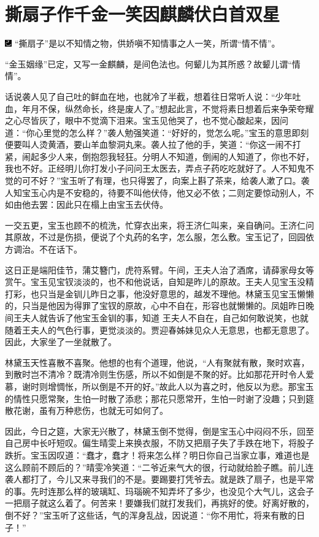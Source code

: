 

\chapter{撕扇子作千金一笑\hspace{.5em}因麒麟伏白首双星}

{\includegraphics[width=3mm]{../Images/00003}  \kaishu ``撕扇子''是以不知情之物，供娇嗔不知情事之人一笑，所谓``情不情''。}

{ \kaishu ``金玉姻缘''已定，又写一金麒麟，是间色法也。何颦儿为其所惑？故颦儿谓``情情''。}

话说袭人见了自己吐的鲜血在地，也就冷了半截，想着往日常听人说：``少年吐血，年月不保，纵然命长，终是废人了。''想起此言，不觉将素日想着后来争荣夸耀之心尽皆灰了，眼中不觉滴下泪来。宝玉见他哭了，也不觉心酸起来，因问道：``你心里觉的怎么样？''袭人勉强笑道：``好好的，觉怎么呢。''宝玉的意思即刻便要叫人烫黄酒，要山羊血黎洞丸来。袭人拉了他的手，笑道：``你这一闹不打紧，闹起多少人来，倒抱怨我轻狂。分明人不知道，倒闹的人知道了，你也不好，我也不好。正经明儿你打发小子问问王太医去，弄点子药吃吃就好了。人不知鬼不觉的可不好？''宝玉听了有理，也只得罢了，向案上斟了茶来，给袭人漱了口。袭人知宝玉心内是不安稳的，待要不叫他伏侍，他又必不依；二则定要惊动别人，不如由他去罢：因此只在榻上由宝玉去伏侍。

一交五更，宝玉也顾不的梳洗，忙穿衣出来，将王济仁叫来，亲自确问。王济仁问其原故，不过是伤损，便说了个丸药的名字，怎么服，怎么敷。宝玉记了，回园依方调治。不在话下。

这日正是端阳佳节，蒲艾簪门，虎符系臂。午间，王夫人治了酒席，请薛家母女等赏午。宝玉见宝钗淡淡的，也不和他说话，自知是昨儿的原故。王夫人见宝玉没精打彩，也只当是金钏儿昨日之事，他没好意思的，越发不理他。林黛玉见宝玉懒懒的，只当是他因为得罪了宝钗的原故，心中不自在，形容也就懒懒的。凤姐昨日晚间王夫人就告诉了他宝玉金钏的事，知道
王夫人不自在，自己如何敢说笑，也就随着王夫人的气色行事，更觉淡淡的。贾迎春姊妹见众人无意思，也都无意思了。因此，大家坐了一坐就散了。

林黛玉天性喜散不喜聚。他想的也有个道理，他说，``人有聚就有散，聚时欢喜，到散时岂不清冷？既清冷则生伤感，所以不如倒是不聚的好。比如那花开时令人爱慕，谢时则增惆怅，所以倒是不开的好。''故此人以为喜之时，他反以为悲。那宝玉的情性只愿常聚，生怕一时散了添悲；那花只愿常开，生怕一时谢了没趣；只到筵散花谢，虽有万种悲伤，也就无可如何了。

因此，今日之筵，大家无兴散了，林黛玉倒不觉得，倒是宝玉心中闷闷不乐，回至自己房中长吁短叹。偏生晴雯上来换衣服，不防又把扇子失了手跌在地下，将股子跌折。宝玉因叹道：``蠢才，蠢才！将来怎么样？明日你自己当家立事，难道也是这么顾前不顾后的？''晴雯冷笑道：``二爷近来气大的很，行动就给脸子瞧。前儿连袭人都打了，今儿又来寻我们的不是。要踢要打凭爷去。就是跌了扇子，也是平常的事。先时连那么样的玻璃缸、玛瑙碗不知弄坏了多少，也没见个大气儿，这会子一把扇子就这么着了。何苦来！要嫌我们就打发我们，再挑好的使。好离好散的，倒不好？''宝玉听了这些话，气的浑身乱战，因说道：``你不用忙，将来有散的日子！''

